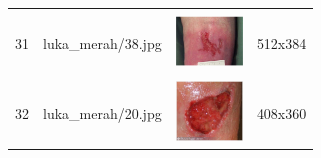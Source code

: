 \begin{table}[H]
\begin{tabular}{|m{0.2in}|m{1.2in}|m{0.7in}|m{0.7in}|}
		& &  &  \\
		31& 
		luka\_merah/38.jpg &
		\includegraphics[width=0.7in]{gambar/dataset_citra/luka_merah/bahan/38.jpg}&
		512x384\\
		\hline
		
		& &  &  \\
		32& 
		luka\_merah/20.jpg &
		\includegraphics[width=0.7in]{gambar/dataset_citra/luka_merah/bahan/20.jpg}&
		408x360\\
		\hline
	\end{tabular}
\end{table}
